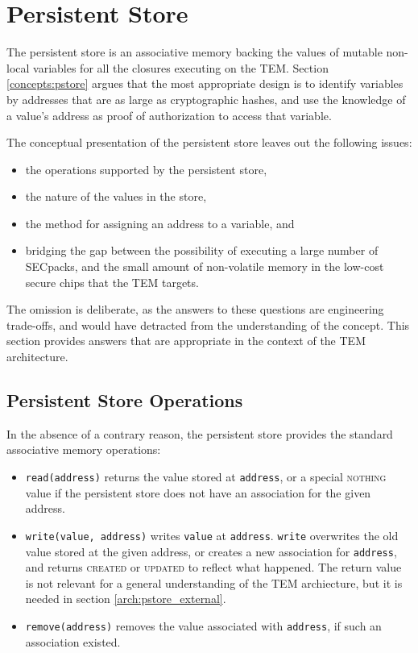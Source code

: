 \section{Persistent Store}\label{arch:pstore}
The persistent store is an associative memory backing the values of
mutable non-local variables for all the closures executing on the TEM. Section
\ref{concepts:pstore} argues that the most appropriate design is to identify
variables by addresses that are as large as cryptographic hashes, and use the
knowledge of a value's address as proof of authorization to access that
variable.

The conceptual presentation of the persistent store leaves out the following
issues:
\begin{itemize}
  \item the operations supported by the persistent store,
  \item the nature of the values in the store,
  \item the method for assigning an address to a variable, and
  \item bridging the gap between the possibility of executing a large number of
  SECpacks, and the small amount of non-volatile memory in the low-cost secure
  chips that the TEM targets.
\end{itemize}
The omission is deliberate, as the answers to these questions are engineering
trade-offs, and would have detracted from the understanding of the concept. This
section provides answers that are appropriate in the context of the TEM
architecture.

\subsection{Persistent Store Operations}
In the absence of a contrary reason, the persistent store provides the standard
associative memory operations:
\begin{itemize}
  \item \texttt{read(address)} returns the value stored at \texttt{address}, or
  a special \textsc{nothing} value if the persistent store does not have an
  association for the given address.
  \item \texttt{write(value, address)} writes \texttt{value} at
  \texttt{address}. \texttt{write} overwrites the old value stored at the given
  address, or creates a new association for \texttt{address}, and returns
  \textsc{created} or \textsc{updated} to reflect what happened. The return
  value is not relevant for a general understanding of the TEM archiecture, but
  it is needed in section \ref{arch:pstore_external}.
  \item \texttt{remove(address)} removes the value associated with
  \texttt{address}, if such an association existed.
\end{itemize}

